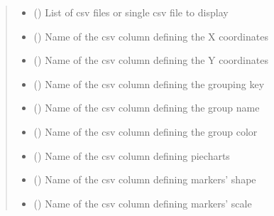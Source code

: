 \documentclass[letterpaper,10pt,english,openany,oneside]{sphinxmanual}
\begin{document}
\begin{fulllineitems}
\begin{quote}
\begin{description}
\begin{itemize}
\item {} 
\sphinxAtStartPar
{} (\sphinxstyleliteralemphasis{\sphinxupquote{ | }}) \textendash{} List of csv files or single csv file to display

\item {} 
\sphinxAtStartPar
{} () \textendash{} Name of the csv column defining the X coordinates

\item {} 
\sphinxAtStartPar
{} () \textendash{} Name of the csv column defining the Y coordinates

\item {} 
\sphinxAtStartPar
{} () \textendash{} Name of the csv column defining the grouping key

\item {} 
\sphinxAtStartPar
{} () \textendash{} Name of the csv column defining the group name

\item {} 
\sphinxAtStartPar
{} () \textendash{} Name of the csv column defining the group color

\item {} 
\sphinxAtStartPar
{} () \textendash{} Name of the csv column defining pie\sphinxhyphen{}charts

\item {} 
\sphinxAtStartPar
{} () \textendash{} Name of the csv column defining markers’ shape

\item {} 
\sphinxAtStartPar
{} () \textendash{} Name of the csv column defining markers’ scale


\end{itemize}
\end{description}
\end{quote}
\end{fulllineitems}
\end{document}
